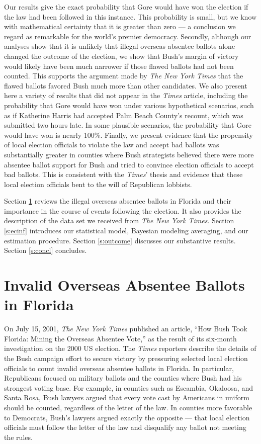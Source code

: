 \documentclass[11pt,titlepage]{article}
\begin{document}
Our results give the exact probability that Gore would have won the
election if the law had been followed in this instance.  This
probability is small, but we know with mathematical certainty that it
is greater than zero --- a conclusion we regard as remarkable for the
world's premier democracy.  Secondly, although our analyses show that
it is unlikely that illegal overseas absentee ballots alone changed
the outcome of the election, we show that Bush's margin of victory
would likely have been much narrower if those flawed ballots had not
been counted.  This supports the argument made by \emph{The New York
  Times} that the flawed ballots favored Bush much more than other
candidates.  We also present here a variety of results that did not
appear in the \emph{Times} article, including the probability that
Gore would have won under various hypothetical scenarios, such as if
Katherine Harris had accepted Palm Beach County's recount, which was
submitted two hours late.  In some plausible scenarios, the
probability that Gore would have won is nearly 100\%.  Finally, we
present evidence that the propensity of local election officials to
violate the law and accept bad ballots was substantially greater in
counties where Bush strategists believed there were more absentee
ballot support for Bush and tried to convince election officials to
accept bad ballots.  This is consistent with the \emph{Times}' thesis
and evidence that these local election officials bent to the will of
Republican lobbists.

Section \ref{s:ballots} reviews the illegal overseas absentee ballots
in Florida and their importance in the course of events following the
election. It also provides the description of the data set we received
from \textit{The New York Times}.  Section \ref{s:ecinf} introduces
our statistical model, Bayesian modeling averaging, and our estimation
procedure.  Section \ref{s:outcome} discusses our substantive results.
Section \ref{s:concl} concludes.

\section{Invalid Overseas Absentee Ballots in Florida} \label{s:ballots}

On July 15, 2001, \textit{The New York Times} published an article,
``How Bush Took Florida: Mining the Overseas Absentee Vote,'' as the
result of its six-month investigation on the 2000 US election.  The
\emph{Times} reporters describe the details of the Bush campaign
effort to secure victory by pressuring selected local election
officials to count invalid overseas absentee ballots in Florida.  In
particular, Republicans focused on military ballots and the counties
where Bush had his strongest voting base.  For example, in counties
such as Escambia, Okaloosa, and Santa Rosa, Bush lawyers argued that
every vote cast by Americans in uniform should be counted, regardless
of the letter of the law.  In counties more favorable to Democrats,
Bush's lawyers argued exactly the opposite --- that local election
officials must follow the letter of the law and disqualify any ballot
not meeting the rules.
\end{document}
